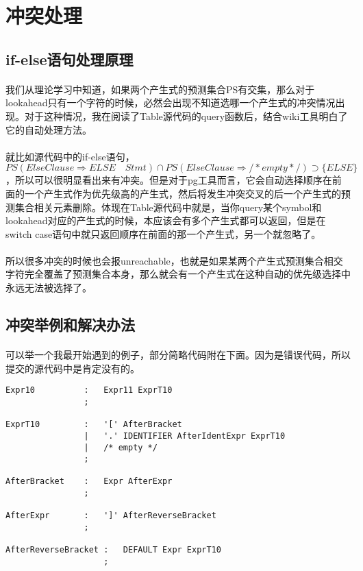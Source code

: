 \documentclass[UTF8]{ctexart}
\begin{document}
\section{冲突处理}
\subsection{if-else语句处理原理}
\paragraph{}我们从理论学习中知道，如果两个产生式的预测集合PS有交集，那么对于lookahead只有一个字符的时候，必然会出现不知道选哪一个产生式的冲突情况出现。对于这种情况，我在阅读了Table源代码的query函数后，结合wiki工具明白了它的自动处理方法。
\paragraph{}就比如源代码中的if-else语句，$PS(ElseClause\Rightarrow ELSE\quad Stmt)\cap PS(ElseClause\Rightarrow /* empty */) \supset \{ELSE\}$，所以可以很明显看出来有冲突。但是对于pg工具而言，它会自动选择顺序在前面的一个产生式作为优先级高的产生式，然后将发生冲突交叉的后一个产生式的预测集合相关元素删除。体现在Table源代码中就是，当你query某个symbol和lookahead对应的产生式的时候，本应该会有多个产生式都可以返回，但是在switch case语句中就只返回顺序在前面的那一个产生式，另一个就忽略了。
\paragraph{}所以很多冲突的时候也会报unreachable，也就是如果某两个产生式预测集合相交字符完全覆盖了预测集合本身，那么就会有一个产生式在这种自动的优先级选择中永远无法被选择了。
\subsection{冲突举例和解决办法}
\paragraph{}可以举一个我最开始遇到的例子，部分简略代码附在下面。因为是错误代码，所以提交的源代码中是肯定没有的。
\begin{lstlisting}
Expr10			:	Expr11 ExprT10
				;

ExprT10         :   '[' AfterBracket
                |   '.' IDENTIFIER AfterIdentExpr ExprT10
                |   /* empty */
                ;

AfterBracket	: 	Expr AfterExpr
				;

AfterExpr		:	']' AfterReverseBracket
				;

AfterReverseBracket	:	DEFAULT Expr ExprT10
					;
\end{lstlisting}
\end{document}
